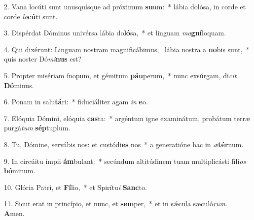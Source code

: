 2. Vana locúti sunt unusquísque ad próximum \textbf{su}um:~*  lábia dolósa, in corde et corde \textit{lo}\textbf{cú}ti sunt.\

3. Dispérdat Dóminus univérsa lábia do\textbf{ló}sa,~*  et linguam \textit{ma}\textbf{gní}loquam.\

4. Qui dixérunt: Linguam nostram magnificábimus, \dag\  lábia nostra a \textbf{no}bis sunt,~*  quis noster Dó\textit{mi}\textbf{nus} est?\

5. Propter misériam ínopum, et gémitum \textbf{páu}perum,~*  nunc exsúrgam, di\textit{cit} \textbf{Dó}minus.\

6. Ponam in salu\textbf{tá}ri:~*  fiduciáliter agam \textit{in} \textbf{e}o.\

7. Elóquia Dómini, elóquia \textbf{cas}ta:~*  argéntum igne examinátum, probátum terræ purgá\textit{tum} \textbf{sép}tuplum.\

8. Tu, Dómine, servábis nos: et custódi\textbf{es} nos~*  a generatióne hac in \textit{æ}\textbf{tér}num.\

9. In circúitu ímpii \textbf{ám}bulant:~*  secúndum altitúdinem tuam multiplicásti fíli\textit{os} \textbf{hó}minum.\

10. Glória Patri, et \textbf{Fí}lio,~*  et Spirítu\textit{i} \textbf{Sanc}to.\

11. Sicut erat in princípio, et nunc, et \textbf{sem}per,~*  et in sǽcula sæculó\textit{rum}. \textbf{A}men.\

